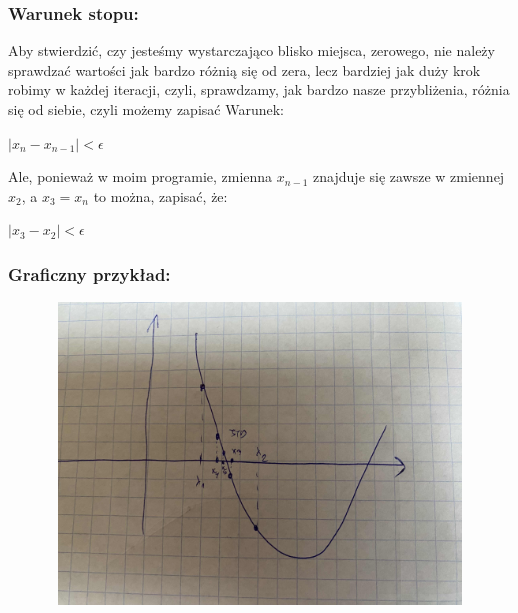 \documentclass[12pt]{article}
\begin{document}
\subsubsection*{Warunek stopu: }
Aby stwierdzić, czy jesteśmy wystarczająco blisko miejsca, zerowego, nie należy sprawdzać wartości jak bardzo różnią się od zera, lecz bardziej jak duży krok robimy w każdej iteracji, czyli, sprawdzamy, jak bardzo nasze przybliżenia, różnia się od siebie, czyli możemy zapisać Warunek:
\begin{center}
    \begin{math}
        |x_{n}-x_{n-1}|<\epsilon
    \end{math}
\end{center}
Ale, ponieważ w moim programie, zmienna $x_{n-1}$ znajduje się zawsze w zmiennej $x_{2}$, a $x_{3}=x_{n}$ to można, zapisać, że:
\begin{center}
    \begin{math}
        |x_{3}-x_{2}|<\epsilon
    \end{math}
\end{center}
\subsubsection*{Graficzny przykład: }
\includegraphics[width=17cm,height=8cm, keepaspectratio]{bisekcja.jpg}
\end{document}
